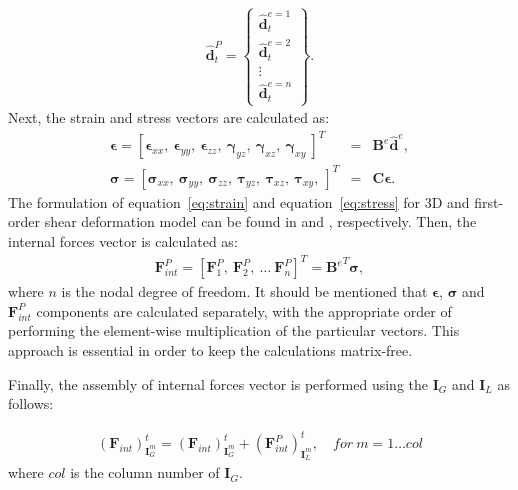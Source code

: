 \begin{eqnarray}
	\widehat{\textbf{d}}_t^P = \left\{ \begin{array}{c}
		\widehat{\textbf{d}}_t^{e=1}\\
		\widehat{\textbf{d}}_t^{e=2}\\
		\vdots\\
		\widehat{\textbf{d}}_t^{e=n} \end{array}\right\}.
\end{eqnarray}
Next, the strain and stress vectors are calculated as:
\begin{eqnarray}
	\label{eq:strain}
	\boldsymbol{\epsilon}=\left[\boldsymbol{\epsilon}_{xx},\ \boldsymbol{\epsilon}_{yy},\ \boldsymbol{\epsilon}_{zz},\ \boldsymbol{\gamma}_{yz},\ \boldsymbol{\gamma}_{xz},\ \boldsymbol{\gamma}_{xy}\ \right]^T&=&\textbf{B}^e\widehat{\textbf{d}}^e,\\
	\label{eq:stress}
	\boldsymbol{\sigma}=\left[\boldsymbol{\sigma}_{xx},\ \boldsymbol{\sigma}_{yy},\ \boldsymbol{\sigma}_{zz},\ \boldsymbol{\tau}_{yz},\ \boldsymbol{\tau}_{xz},\ \boldsymbol{\tau}_{xy},\ \right]^T&=&\textbf{C}\boldsymbol{\epsilon}.
\end{eqnarray}
The formulation of equation~\ref{eq:strain} and equation~\ref{eq:stress} for 3D and first-order shear deformation model can be found in \cite{kudela2016parallel} and \cite{kudela2020parallel}, respectively.
Then, the internal forces vector is calculated as:
\begin{eqnarray}
	\label{eq:forces}
	\textbf{F}^P_{int}=\left[\textbf{F}^P_1,\ \textbf{F}^P_2,\ \ldots\ \textbf{F}^P_{n} \right]^T={\textbf{B}^e}^T\boldsymbol{\sigma},
\end{eqnarray}
where $n$ is the nodal degree of freedom.
It should be mentioned that \(\boldsymbol{\epsilon}\), \(\boldsymbol{\sigma}\) and \(\textbf{F}^P_{int}\) components are calculated separately, with the appropriate order of performing the element-wise multiplication of the particular vectors.
This approach is essential in order to keep the calculations matrix-free.

Finally, the assembly of internal forces vector is performed using the \(\textbf{I}_G\) and \(\textbf{I}_L\) as follows:

\begin{eqnarray}
	\label{eq:Fint}
	{\left(\textbf{F}_{int}\right)}^t_{\textbf{I}^m_G} = {\left(\textbf{F}_{int}\right)}^t_{\textbf{I}^m_G} + {\left(\textbf{F}^P_{int}\right)}^t_{\textbf{I}^m_L},\quad for\ m=1\ldots col 
\end{eqnarray}
where \(col\) is the column number of \(\textbf{I}_G\).


